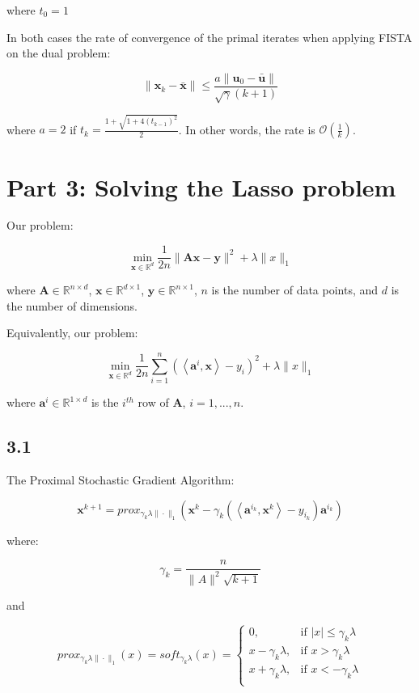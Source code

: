\documentclass[12pt]{article}
\begin{document}
where $t_0  =1 $

In both cases the rate of convergence of the primal iterates when applying FISTA on the dual problem:



\[ \|\textbf{x}_k - \bar{\textbf{x}}\| \leq \frac{a\|\textbf{u}_0 - \bar{\textbf{u}}\|}{\sqrt{\gamma}(k+1)}\]

where $a = 2$ if $t_k = \frac{1+\sqrt{1+ 4 (t_{k-1})^2}}{2}$. In other words, the rate is $\mathcal{O}(\frac{1}{k})$.

\newpage
\section*{Part 3: Solving the Lasso problem}

Our problem:

\[\min_{\textbf{x} \in \mathbb{R}^d} \frac{1}{2n} \|\textbf{Ax}-\textbf{y}\|^2 + \lambda \|x\|_1\]

where $\textbf{A} \in \mathbb{R}^{n\times d}$, $\textbf{x} \in \mathbb{R}^{d \times 1}$, $\textbf{y} \in \mathbb{R}^{n \times 1}$, $n$ is the number of data points, and $d$ is the number of dimensions.

Equivalently, our problem:

\[\min_{\textbf{x} \in \mathbb{R}^d} \frac{1}{2n} \sum_{i=1}^n \left(\left\langle \textbf{a}^i, \textbf{x} \right\rangle - y_i \right)^2 + \lambda \|x\|_1\]

where $\textbf{a}^i \in \mathbb{R}^{1 \times d}$ is the $i^{th}$ row of \textbf{A}, $i=1, ..., n$.

\subsection*{3.1}
The Proximal Stochastic Gradient Algorithm:

\[\textbf{x}^{k+1} = prox_{\gamma_k \lambda \|\cdot\|_1} \left(\textbf{x}^k - \gamma_k \left(\left\langle \textbf{a}^{i_k}, \textbf{x}^{k}\right\rangle - y_{i_k}\right)\textbf{a}^{i_k}\right)\]

where:

\[\gamma_k = \frac{n}{\|A\|^2 \sqrt{k+1}}\]

and

\[prox_{\gamma_k \lambda \|\cdot\|_1}(x) = soft_{\gamma_k \lambda}(x) = \begin{cases}
      0, &  \text{if } |x| \leq \gamma_k \lambda \\
      x-\gamma_k \lambda, & \text{if } x > \gamma_k \lambda \\
      x+\gamma_k \lambda, & \text{if } x < - \gamma_k \lambda \\
   \end{cases}\]
\end{document}
